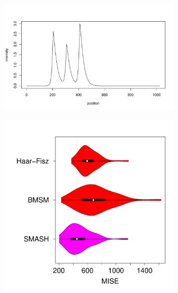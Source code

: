 \documentclass[12pt]{article}
\begin{document}
\begin{figure}
\centering
		\begin{subfigure}[b]{0.75\textwidth}
        \centering
        \includegraphics[width=\textwidth]{bursts_pois.pdf}
        \caption{}
        \label{fig:bursts_fn}
    \end{subfigure}
    \begin{subfigure}[b]{0.45\textwidth}
        \centering
        \includegraphics[width=\textwidth]{violin_pois_1.pdf}

\end{subfigure}
\end{figure}
\end{document}

